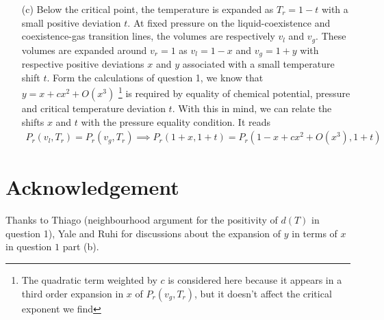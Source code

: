 \documentclass[10pt, a4paper]{article}
\begin{document}
{\begin{enumerate}
\begin{python}
vr, x = sp.symbols("vr x")

P = sp.exp(2-2/vr)/(2*vr - 1)
P = P.subs({vr:1+x}).series(x, 0, 4)
  \end{python}
  Using the previous expansion, we can solve for $x$ as a function of $P_r$ leading to 
  \begin{align*}
    x = v_r-1 = -\frac{3}{2}\left(P_r - 1\right)^{1/3} \sim \left(P_r - 1\right)^{1/\delta}
  \end{align*}
  leading to the critical same critical exponent $\delta = 3$ as in the Van der Waals model. We this result to extract the $\gamma$ critical exponent describing the scaling of isothermal compressibility $k_T$ at $T_r = 1$ as a function of $P_r$. We have 
  \begin{align*}
    k_T = -\dfrac{1}{v_r}\left(\frac{\partial v_r}{\partial P_r}\right) \approx \frac{-\frac{3}{6}\left(P_r - 1\right)^{-2/3}}{-\frac{3}{2}\left(P_r - 1\right)^{1/3}} = -\frac{-\frac{3}{6}\left(P_r - 1\right)^{-2/3}}{-\frac{3}{2}\left(P_r - 1\right)^{1/3}} = -\frac{1}{3} \left(P_r - 1\right)^{-1} \sim (P_r - 1)^{-\gamma}
  \end{align*}
  which is consistent with $\gamma = 1$. 


  \item[(c)] Below the critical point, the temperature is expanded as $T_r = 1 - t$ with a small positive deviation $t$. At fixed pressure on the liquid-coexistence and coexistence-gas transition lines, the volumes are respectively $v_l$ and $v_g$. These volumes are expanded around $v_r = 1$ as $v_l = 1 - x$ and $v_g = 1 + y$ with respective positive deviations $x$ and $y$ associated with a small temperature shift $t$. Form the calculations of question 1, we know that $y = x + c x^2 + O(x^3)$ \footnote{The quadratic term weighted by $c$ is considered here because it appears in a third order expansion in $x$ of $P_r(v_g, T_r)$, but it doesn't affect the critical exponent we find} is required by equality of chemical potential, pressure and critical temperature deviation $t$. With this in mind, we can relate the shifts $x$ and $t$ with the pressure equality condition. It reads  
  \begin{align*}
    P_r(v_l, T_r) = P_r(v_g, T_r) \implies  P_r(1+x, 1+t) = P_r(1-x + cx^2 + O(x^3), 1+t)
  \end{align*} 
\end{enumerate}






\section{Acknowledgement}
Thanks to Thiago (neighbourhood argument for the positivity of $d(T)$ in question 1), Yale and Ruhi for discussions about the expansion of $y$ in terms of $x$ in question $1$ part (b). 
}

\makereferences


\end{document}
